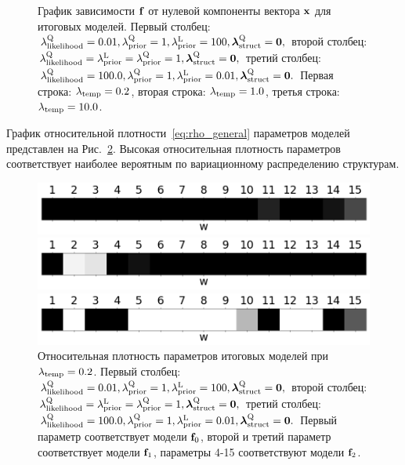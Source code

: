 \begin{figure}
\caption{График зависимости $\mathbf{f}$ от нулевой компоненты вектора $\mathbf{x}$ для итоговых моделей.
Первый столбец: $\lambda_\text{likelihood}^\text{Q} = 0.01, \lambda_\text{prior}^\text{Q} = 1, \lambda_\text{prior}^\text{L} = 100, \boldsymbol{\lambda}_\text{struct}^\text{Q} = \mathbf{0},$  второй столбец: $\lambda_\text{likelihood}^\text{Q} = \lambda_\text{prior}^\text{L} = \lambda_\text{prior}^\text{Q} = 1, \boldsymbol{\lambda}_\text{struct}^\text{Q} = \mathbf{0},$ 
третий столбец: $\lambda_\text{likelihood}^\text{Q} = 100.0, \lambda_\text{prior}^\text{Q} = 1, \lambda_\text{prior}^\text{L} = 0.01, \boldsymbol{\lambda}_\text{struct}^\text{Q} = \mathbf{0}.$ 
Первая строка: $\lambda_{\text{temp}} = 0.2$, вторая строка: $\lambda_{\text{temp}} = 1.0$, третья строка: $\lambda_{\text{temp}} = 10.0$.}
\label{fig:fig_plot_synthetic_results}
\end{figure}




График относительной плотности~\eqref{eq:rho_general} параметров моделей представлен на Рис.~\ref{fig:bar_rho}. Высокая относительная плотность параметров соответствует наиболее вероятным по вариационному распределению структурам.


\begin{figure}
 \begin{minipage}[]{.3\textwidth}
    \includegraphics[width=\textwidth]{plots/experiment_structures/bar_0_2kld.png}
\subcaption{}
\end{minipage}
 \begin{minipage}{.3\textwidth}
    \includegraphics[width=\textwidth]{plots/experiment_structures/bar_0_2elbo.png}
\subcaption{}
\end{minipage}
 \begin{minipage}{.3\textwidth}
    \includegraphics[width=\textwidth]{plots/experiment_structures/bar_0_2overfit.png}
\subcaption{}
\end{minipage}


\caption{Относительная плотность параметров итоговых моделей при $\lambda_{\text{temp}} = 0.2$.
Первый столбец: $\lambda_\text{likelihood}^\text{Q} = 0.01, \lambda_\text{prior}^\text{Q} = 1, \lambda_\text{prior}^\text{L} = 100, \boldsymbol{\lambda}_\text{struct}^\text{Q} = \mathbf{0},$  второй столбец: $\lambda_\text{likelihood}^\text{Q} = \lambda_\text{prior}^\text{L} = \lambda_\text{prior}^\text{Q} = 1, \boldsymbol{\lambda}_\text{struct}^\text{Q} = \mathbf{0},$ 
третий столбец: $\lambda_\text{likelihood}^\text{Q} = 100.0, \lambda_\text{prior}^\text{Q} = 1, \lambda_\text{prior}^\text{L} = 0.01, \boldsymbol{\lambda}_\text{struct}^\text{Q} = \mathbf{0}.$ Первый параметр соответствует модели $\mathbf{f}_0$, второй и третий параметр соответствует модели $\mathbf{f}_1$, параметры 4-15 соответствуют модели $\mathbf{f}_2$.}
\label{fig:bar_rho}
\end{figure}


